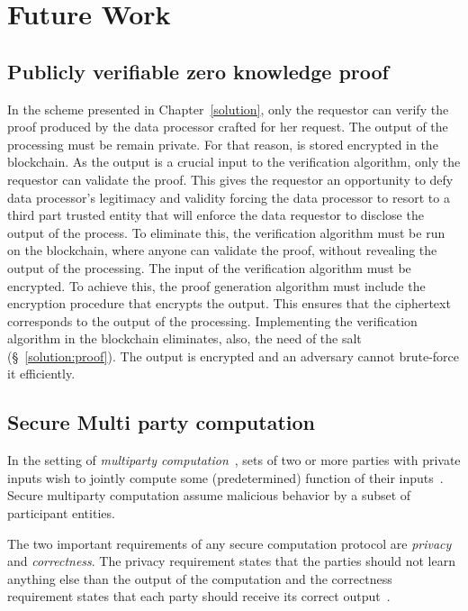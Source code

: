 \chapter{Future Work}
\label{future_work}

\section{Publicly verifiable zero knowledge proof}
\label{future_work:zkp_ver}

In the scheme presented in Chapter~\ref{solution}, only the requestor can verify the proof produced by the data processor crafted for her request. The output of the processing must be remain private. For that reason, is stored encrypted in the blockchain. As the output is a crucial input to the verification algorithm, only the requestor can validate the proof. This gives the requestor an opportunity to defy data processor's legitimacy and validity forcing the data processor to resort to a third part trusted entity that will enforce the data requestor to disclose the output of the process. To eliminate this, the verification algorithm must be run on the blockchain, where anyone can validate the proof, without revealing the output of the processing. The input of the verification algorithm must be encrypted. To achieve this, the proof generation algorithm must include the encryption procedure that encrypts the output. This ensures that the ciphertext corresponds to the output of the processing. Implementing the verification algorithm in the blockchain eliminates, also, the need of the salt (§~\ref{solution:proof}). The output is encrypted and an adversary cannot brute-force it efficiently.

\section{Secure Multi party computation}
\label{future_work:mpc}

In the setting of \textit{multiparty computation}~\cite{Ben-Or:1988:CTN:62212.62213}, sets of two or more parties with private inputs wish to jointly compute some (predetermined) function of their inputs~\cite{mpc}. Secure multiparty computation assume malicious behavior by a subset of participant entities.

The two important requirements of any secure computation protocol are \textit{privacy} and \textit{correctness}. The privacy requirement states that the parties should not learn anything else than the output of the computation and the correctness requirement states that each party should receive its correct output~\cite{mpc}.

